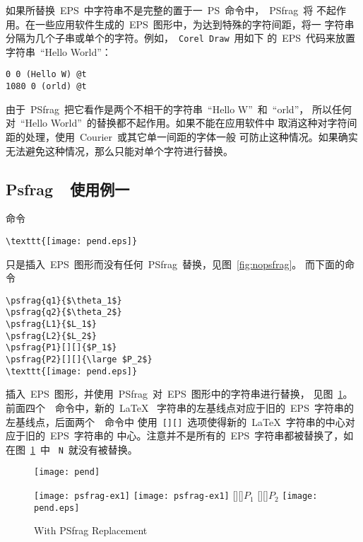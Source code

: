如果所替换~EPS~中字符串不是完整的置于一~PS~命令中，~\textsf{PSfrag}~将
不起作用。在一些应用软件生成的~EPS~图形中，为达到特殊的字符间距，将一
字符串分隔为几个子串或单个的字符。例如，~\texttt{Corel Draw}~用如下
的~EPS~代码来放置字符串~``Hello World''：
\begin{Verbatim}[xleftmargin=1cm]
0 0 (Hello W) @t
1080 0 (orld) @t
\end{Verbatim}
由于~\textsf{PSfrag}~把它看作是两个不相干的字符串~``Hello W''~和~``orld''，
所以任何对~``Hello World''~的替换都不起作用。如果不能在应用软件中
取消这种对字符间距的处理，使用~Courier~或其它单一间距的字体一般
可防止这种情况。如果确实无法避免这种情况，那么只能对单个字符进行替换。

\subsection{Psfrag~~使用例一}\label{ssec:psfragex1}

命令
\begin{Verbatim}[xleftmargin=1cm]
\texttt{[image: pend.eps]}
\end{Verbatim}
只是插入~EPS~图形而没有任何~\textsf{PSfrag}~替换，见图~\ref{fig:nopsfrag}。
而下面的命令
\begin{Verbatim}[xleftmargin=1cm]
\psfrag{q1}{$\theta_1$}
\psfrag{q2}{$\theta_2$}
\psfrag{L1}{$L_1$}
\psfrag{L2}{$L_2$}
\psfrag{P1}[][]{$P_1$}
\psfrag{P2}[][]{\large $P_2$}
\texttt{[image: pend.eps]}
\end{Verbatim}
插入~EPS~图形，并使用~\textsf{PSfrag}~对~EPS~图形中的字符串进行替换，
见图~\ref{fig:psfragex1}。前面四个~~命令中，新的~\LaTeX{}~
字符串的左基线点对应于旧的~EPS~字符串的左基线点，后面两个~~命令中
使用~\texttt{[][]}~选项使得新的~\LaTeX{}~字符串的中心对应于旧的~EPS~字符串的
中心。注意并不是所有的~EPS~字符串都被替换了，如在图~\ref{fig:psfragex1}~中
~\texttt{N}~就没有被替换。

\begin{figure}
\hspace{-1.5cm}
\begin{minipage}[t]{.7\textwidth}
\vspace{0pt}
\centering
\texttt{[image: pend]}
\caption{Without PSfrag Replacement}\label{fig:nopsfrag}
\end{minipage}%
\hspace{-3cm}
\begin{minipage}[t]{.7\textwidth}
\vspace{0pt}
\ifpdf
\centering
\texttt{[image: psfrag-ex1]}
\else
\ifdvipdfm
\centering
\texttt{[image: psfrag-ex1]}
\else
{}
[][]{$P_1$}
[][]{\large $P_2$}
\centering
\texttt{[image: pend.eps]}
\fi
\fi
\caption{With PSfrag Replacement}\label{fig:psfragex1}
\end{minipage}
\end{figure}

